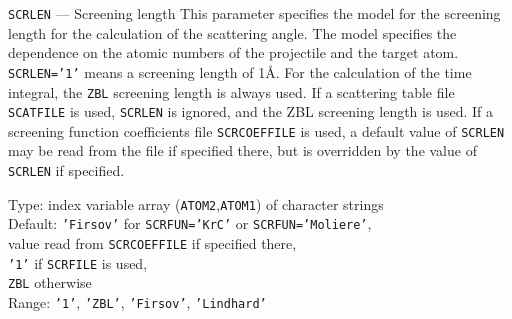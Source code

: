 \begin{keydescription}{\texttt{SCRLEN} --- Screening length}
%
  This parameter specifies the model for the screening length for the
  calculation of the scattering angle. The model specifies the dependence 
  on the atomic numbers of the projectile and the target atom. 
  \texttt{SCRLEN='1'} means a screening length of 1\AA. For the
  calculation of the time integral, the \texttt{ZBL} screening
  length is always used. If a scattering table file \texttt{SCATFILE}
  is used, \texttt{SCRLEN} is ignored, and the ZBL screening length is
  used. If a screening function coefficients file \texttt{SCRCOEFFILE}
  is used, a default value of \texttt{SCRLEN} may be read from the file
  if specified there, but is overridden by the value of \texttt{SCRLEN}
  if specified.
  \begin{keytab}
    Type:    \> index variable array (\texttt{ATOM2},\texttt{ATOM1}) 
                of character strings \\ 
    Default: \> \texttt{'Firsov'} for \texttt{SCRFUN='KrC'} or 
                \texttt{SCRFUN='Moliere'}, \\
             \> value read from \texttt{SCRCOEFFILE} if specified there, \\
             \> \texttt{'1'} if \texttt{SCRFILE} is used, \\
             \> \texttt{ZBL} otherwise \\
    Range:   \> \texttt{'1'}, \texttt{'ZBL'}, \texttt{'Firsov'}, 
                \texttt{'Lindhard'}
  \end{keytab}
\end{keydescription}

